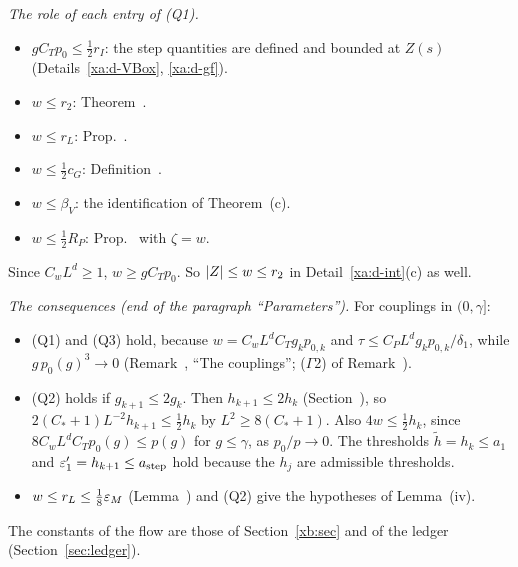 \begin{detail}\label{xa:d-Q}
\emph{The role of each entry of (Q1).}
\begin{itemize}
\item $gC_Tp_0\le\frac12r_I$: the step quantities are defined and bounded at $Z(s)$ (Details~\ref{xa:d-VBox}, \ref{xa:d-gf}).
\item $w\le r_2$: Theorem~.
\item $w\le r_L$: Prop.~.
\item $w\le\frac12c_G$: Definition~.
\item $w\le\beta_V$: the identification of Theorem~(c).
\item $w\le\frac12R_P$: Prop.~ with $\zeta=w$.
\end{itemize}
Since $C_wL^d\ge1$, $w\ge gC_Tp_0$. So $\lvert Z\rvert\le w\le r_2$ in Detail~\ref{xa:d-int}(c) as well.

\emph{The consequences (end of the paragraph ``Parameters'').} For couplings in $(0,\gamma]$:
\begin{itemize}
\item (Q1) and (Q3) hold, because $w=C_wL^dC_Tg_kp_{0,k}$ and $\tau\le C_PL^dg_kp_{0,k}/\delta_1$, while $g\,p_0(g)^3\to0$ (Remark~, ``The couplings''; ($\Gamma$2) of Remark~).
\item (Q2) holds if $g_{k+1}\le2g_k$. Then $h_{k+1}\le2h_k$ (Section~), so $2(C_*+1)L^{-2}h_{k+1}\le\frac12h_k$ by $L^2\ge8(C_*+1)$. Also $4w\le\frac12h_k$, since $8C_wL^dC_Tp_0(g)\le p(g)$ for $g\le\gamma$, as $p_0/p\to0$. The thresholds $\tilde h=h_k\le a_1$ and $\varepsilon'_1=h_{k+1}\le a_{\rm step}$ hold because the $h_j$ are admissible thresholds.
\item $w\le r_L\le\frac18\varepsilon_M$ (Lemma~) and (Q2) give the hypotheses of Lemma~(iv).
\end{itemize}
The constants of the flow are those of Section~\ref{xb:sec} and of the ledger (Section~\ref{sec:ledger}).
\end{detail}

